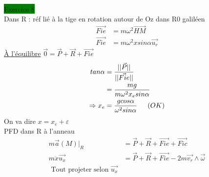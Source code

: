 \documentclass[a4paper,twocolumn,landscape]{article}
\begin{document}
\noindent \colorbox{green}{Exercice 8}\\
Dans R : réf lié à la tige en rotation autour de Oz dans R0 galiléen\begin{align*}
    \vec{Fie} &= m\omega^2 \vec{HM}\\
    \vec{Fie} &= m\omega^2 x sin\alpha \vec{u_r}
\end{align*}
\underline{À l'équilibre} \(\vec{0} = \vec{P} + \vec{R} + \vec{Fie}\)\\
\begin{align*}
    tan \alpha &= \frac{||\vec{P}||}{||\vec{Fie}||}\\
    &= \frac{mg}{m\omega^2x_esin\alpha}\\
    \Rightarrow x_e &= \frac{gcos\alpha}{\omega^2 sin\alpha} \indent (OK)
\end{align*}
On va dire \(x = x_e + \varepsilon\)\\
PFD dans R à l'anneau\begin{align*}
    m\vec{a}(M)|_R &= \vec{P} + \vec{R} + \vec{Fie} + \vec{Fic}\\
    m\ddot{x}\vec{u_x} &= \vec{P}+\vec{R}+\vec{Fie} -2m\vec{v_r}\wedge \vec{\omega}\\
    \text{ Tout projeter selon \(\vec{u_x}\)}
\end{align*}
\end{document}
